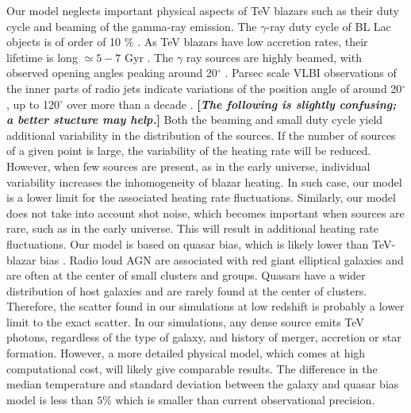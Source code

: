 \documentclass[twocolumns]{emulateapj}
\newcommand\Cc[1]{{\color{blue} \bf #1}} %
\begin{document}
Our model neglects important physical aspects of TeV blazars such as their duty cycle and beaming of the gamma-ray emission. The $\gamma$-ray duty cycle of BL Lac objects is of order of 10 $\%$ \citep{1996ApJ...464..600S}. As TeV blazars have low accretion rates, their lifetime is long $\simeq 5-7$ Gyr \citep{2002ApJ...571..226C}. The $\gamma$ ray sources are highly beamed, with observed opening angles peaking around 20$^{\circ}$ \citep{2009A&A...507L..33P}. Parsec scale VLBI observations of the inner parts of radio jets indicate variations of the position angle of around 20$^{\circ}$, up to 120$^{\circ}$ over more than a decade \citep{2013AJ....146..120L}. \Cc{[{\em The following is slightly confusing; a better stucture may help.}]} Both the beaming and small duty cycle yield additional variability in the distribution of the sources. If the number of sources of a given point is large, the variability of the heating rate will be reduced. However, when few sources are present, as in the early universe, individual variability increases the inhomogeneity of blazar heating. In such case, our model is a lower limit for the associated heating rate fluctuations. Similarly, our model does not take into account shot noise, which becomes important when sources are rare, such as in the early universe. This will result in additional heating rate fluctuations.
Our model is based on quasar bias, which is likely lower than TeV-blazar bias \citep{2014arXiv1410.0358A}. Radio loud AGN are associated with red giant elliptical galaxies \citep{2007A&A...476..723H} and are often at the center of small clusters and groups. Quasars have a wider distribution of host galaxies and are rarely found at the center of clusters. Therefore, the scatter found in our simulations at low redshift is probably a lower limit to the exact scatter. In our simulations, any dense source emits TeV photons, regardless of the type of galaxy, and history of merger, accretion or star formation. However, a more detailed physical model, which comes at high computational cost, will likely give comparable results. The difference in the median temperature and standard deviation between the galaxy and quasar bias model is less than $5\%$ which is smaller than current observational precision.
\end{document}
